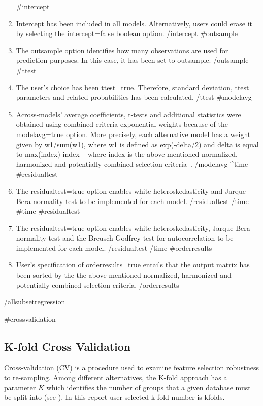 \documentclass{article}
\begin{document}
\begin{enumerate}
  {{#intercept}}
  \item Intercept has been included in all models. Alternatively, users could erase it by selecting the intercept=false boolean option.
  {{/intercept}}
  {{#outsample}}
  \item The outsample option identifies how many observations are used for prediction purposes. In this case, it has been set to {{outsample}}.
  {{/outsample}}
  {{#ttest}}
  \item The user's choice has been ttest=true. Therefore, standard deviation, ttest parameters and related probabilities has been calculated.
  {{/ttest}}
  {{#modelavg}}
  \item Across-models' average coefficients, t-tests and additional statistics were obtained using combined-criteria exponential weights because of the modelavg=true option. More precisely, each alternative model has a weight given by w1/sum(w1), where w1 is defined as exp(-delta/2) and delta is equal to max(index)-index -- where index is the above mentioned normalized, harmonized and potentially combined selection criteria--.
  {{/modelavg}}
  {{^time}}
  {{#residualtest}}
  \item The residualtest=true option enables white heteroskedasticity and Jarque-Bera normality test to be implemented for each model.
  {{/residualtest}}
  {{/time}}
  {{#time}}
  {{#residualtest}}
  \item The residualtest=true option enables white heteroskedasticity, Jarque-Bera normality test and the Breusch-Godfrey test for autocorrelation to be implemented for each model.
  {{/residualtest}}
  {{/time}}
  {{#orderresults}}  
  \item User's specification of orderresults=true entails that the output matrix has been sorted by the the above mentioned normalized, harmonized and potentially combined selection criteria.
  {{/orderresults}}
\end{enumerate}
{{/allsubsetregression}}


{{#crossvalidation}}
\subsection{K-fold Cross Validation}
Cross-validation (CV) is a procedure used to examine feature selection robustness to re-sampling. Among different alternatives, the K-fold approach has a parameter $K$ which identifies the number of groups that a given database must be split into (see \cite{arlot2010}). In this report user selected k-fold number is {{kfolds}}.
\end{document}
